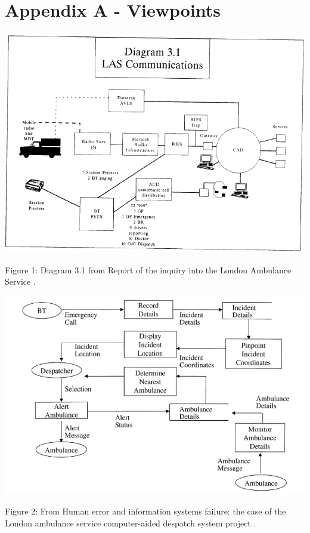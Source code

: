 \section*{Appendix A - Viewpoints}

\includegraphics{img/image1}

Figure 1: Diagram 3.1 from Report of the inquiry into the London Ambulance Service \autocite[27]{officialreport}.

\includegraphics{img/image2}

Figure 2: From Human error and information systems failure: the case of the London ambulance service computer-aided despatch system project \autocite[707]{beynon1999human}.